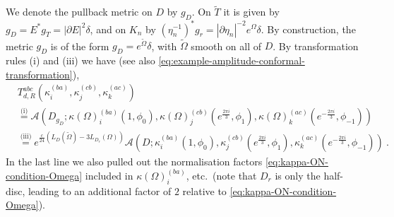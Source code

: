 \documentclass[11pt,a4paper]{article}
\numberwithin{equation}{section}
\begin{document}
We denote the pullback metric on $D$ by $g_D$. On $\widetilde T$ it is given by $g_D = E^* g_T = |\partial E|^2 \delta$, and on $K_n$ by $(\eta_n^{-1})^* g_r = |\partial\eta_n|^{-2} e^{\Omega} \delta$. 
By construction, the metric $g_D$ is of the form $g_D = e^{\tilde\Omega} \delta$, with $\tilde \Omega$ smooth on all of $D$. By transformation rules (i) and (iii) we have (see also \eqref{eq:example-amplitude-conformal-transformation}),
\begin{align}
    &T_{d,R}^{abc}(\kappa^{(ba)}_i,\kappa^{(cb)}_j,\kappa^{(ac)}_k)
\nonumber \\
    &\overset{\text{(i)}}=
    \mathcal{A}(D_{g_D};\kappa(\Omega)_i^{(ba)}(1,\phi_0),\kappa(\Omega)_j^{(cb)}(e^{\frac{2 \pi i}{3}},\phi_1),\kappa(\Omega)_k^{(ac)}(e^{-\frac{2 \pi i}{3}},\phi_{-1}))  
\nonumber \\    
    &\overset{\text{(iii)}}=
    e^{\frac{c}{24}( L_D(\tilde\Omega) - 3 L_{D_r}(\Omega) ) }
    \mathcal{A}(D;\kappa^{(ba)}_i(1,\phi_0),\kappa^{(cb)}_j(e^{\frac{2 \pi i}{3}},\phi_1),\kappa^{(ac)}_k(e^{-\frac{2 \pi i}{3}},\phi_{-1}))  \ .
    \label{eq:triangle-aux1}
\end{align}
In the last line we also pulled out the normalisation factors \eqref{eq:kappa-ON-condition-Omega} included in $\kappa(\Omega)_i^{(ba)}$, etc.\ (note that $D_r$ is only the half-disc, leading to an additional factor of $2$ relative to \eqref{eq:kappa-ON-condition-Omega}). 
\end{document}
